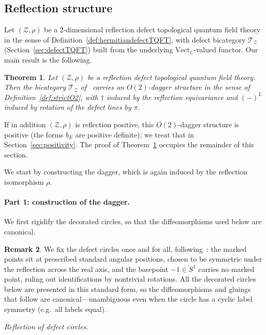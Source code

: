 \documentclass[11pt]{article}
\newtheorem{theorem}{Theorem}[section]
\theoremstyle{definition}
\newtheorem{remark}[theorem]{Remark}
\newcommand{\cT}{\mathcal{T}}
\newcommand{\cZ}{\mathcal{Z}}
\newcommand{\bC}{\mathbb{C}}
\newcommand{\Vect}{\mathrm{Vect}}
\newcommand{\Or}{O} %
\newcommand{\dg}{\dagger}
\begin{document}
\subsection{Reflection structure}
\label{sec:dim2}
Let $(\cZ, \rho)$ be a 2-dimensional reflection defect topological quantum field theory in the sense of Definition~\ref{def:hermitiandefectTQFT}, with defect bicategory $\cT_\cZ$ (Section~\ref{sec:defectTQFT}) built from the underlying $\Vect_\bC$-valued functor. Our main result is the following.

\begin{theorem}
\label{thm:extraction}
Let $(\cZ, \rho)$ be a reflection defect topological quantum field theory. Then the bicategory $\cT_\cZ$ of~\cite{DKR11,Car16} carries an $\Or(2)$-dagger structure in the sense of Definition~\ref{def:strictO2}, with $\dg$ induced by the reflection equivariance and $(-)^L$ induced by rotation of the defect lines by $\pi$.
\end{theorem}

If in addition $(\cZ,\rho)$ is reflection positive, this $\Or(2)$-dagger structure is positive (the forms $b_E$ are positive definite); we treat that in Section~\ref{sec:positivity}. The proof of Theorem~\ref{thm:extraction} occupies the remainder of this section.

We start by constructing the dagger, which is again induced by the reflection isomorphism $\rho$.

\paragraph{Part 1: construction of the dagger.}

We first rigidify the decorated circles, so that the diffeomorphisms used below are canonical.

\begin{remark}
\label{rem:canonicityu}
We fix the defect circles once and for all, following~\cite{Car16,DKR11}: the marked points sit at prescribed standard angular positions, chosen to be symmetric under the reflection across the real axis, and the basepoint $-1 \in S^1$ carries no marked point, ruling out identifications by nontrivial rotations. All the decorated circles below are presented in this standard form, so the diffeomorphisms and gluings that follow are canonical---unambiguous even when the circle has a cyclic label symmetry (e.g.\ all labels equal).
\end{remark}

\emph{Reflection of defect circles.}
\end{document}
